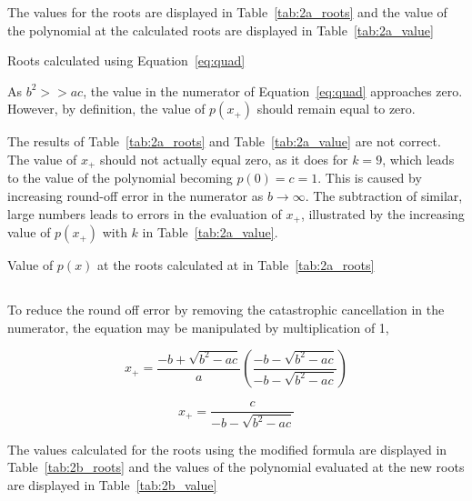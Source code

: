 \documentclass[11pt]{article} %
\begin{document}
The values for the roots are displayed in Table~\ref{tab:2a_roots} and the value of the polynomial at the calculated roots are displayed in Table~\ref{tab:2a_value}


\begin{table}[h!]
\centering

\caption{Roots calculated using Equation~\ref{eq:quad}}
\label{tab:2a_roots}
\end{table}

As $b^2 >> ac$, the value in the numerator of Equation~\ref{eq:quad} approaches zero. However, by definition, the value of  $p(x_+)$ should remain equal to zero.

The results of Table~\ref{tab:2a_roots} and Table~\ref{tab:2a_value} are not correct. The value of $x_+$ should not actually equal zero, as it does for $k=9$, which leads to the value of the polynomial becoming  $p(0) = c = 1$. This is caused by increasing round-off error in the numerator as $b \rightarrow \infty$. The subtraction of similar, large numbers leads to errors in the evaluation of $x_+$, illustrated by the increasing value of $p(x_+)$ with $k$ in Table~\ref{tab:2a_value}.

\begin{table}[h!]
\centering

\caption{Value of $p(x)$ at the roots calculated at in Table~\ref{tab:2a_roots}}
\label{tab:2a_value}
\end{table}

\subsection{} %

To reduce the round off error by removing the catastrophic cancellation in the numerator, the equation may be manipulated by multiplication of 1,

\begin{equation}
x_+ = \frac{-b + \sqrt{b^2 -ac}}{a}  \left ( \frac{-b - \sqrt{b^2 -ac}}{-b - \sqrt{b^2 -ac}} \right )
\end{equation}

\begin{equation}
x_+ = \frac{c}{-b - \sqrt{b^2 -ac}}
\label{eq:quadmod}
\end{equation}

The values calculated for the roots using the modified formula are displayed in Table~\ref{tab:2b_roots} and the values of the polynomial evaluated at the new roots are displayed in Table~\ref{tab:2b_value}
\end{document}
